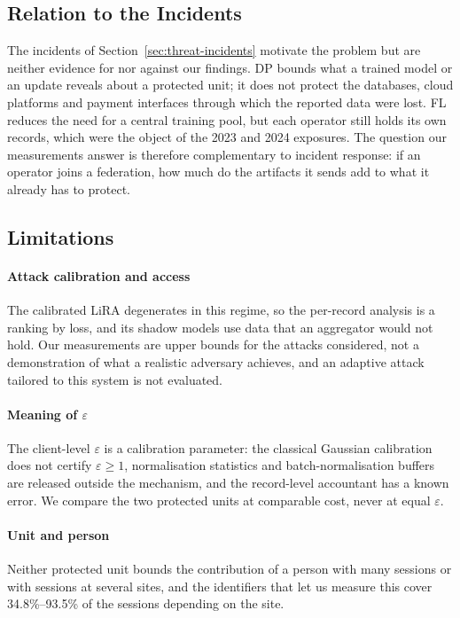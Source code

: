 \subsection{Relation to the Incidents}
\label{sec:disc-incidents}

The incidents of Section~\ref{sec:threat-incidents} motivate the problem but
are neither evidence for nor against our findings. DP bounds what a trained
model or an update reveals about a protected unit; it does not protect the
databases, cloud platforms and payment interfaces through which the reported
data were lost. FL reduces the need for a central training pool, but each
operator still holds its own records, which were the object of the 2023 and
2024 exposures. The question our measurements answer is therefore
complementary to incident response: if an operator joins a federation, how
much do the artifacts it sends add to what it already has to protect.

\subsection{Limitations}
\label{sec:disc-limits}

\paragraph{Attack calibration and access} The calibrated LiRA degenerates in
this regime, so the per-record analysis is a ranking by loss, and its shadow
models use data that an aggregator would not hold. Our measurements are
upper bounds for the attacks considered, not a demonstration of what a
realistic adversary achieves, and an adaptive attack tailored to this system
is not evaluated.

\paragraph{Meaning of $\varepsilon$} The client-level $\varepsilon$ is a
calibration parameter: the classical Gaussian calibration does not certify
$\varepsilon \ge 1$, normalisation statistics and batch-normalisation buffers
are released outside the mechanism, and the record-level accountant has a
known error. We compare the two protected units at comparable cost, never at
equal $\varepsilon$.

\paragraph{Unit and person} Neither protected unit bounds the contribution of a
person with many sessions or with sessions at several sites, and the
identifiers that let us measure this cover 34.8\%--93.5\% of the sessions
depending on the site.

